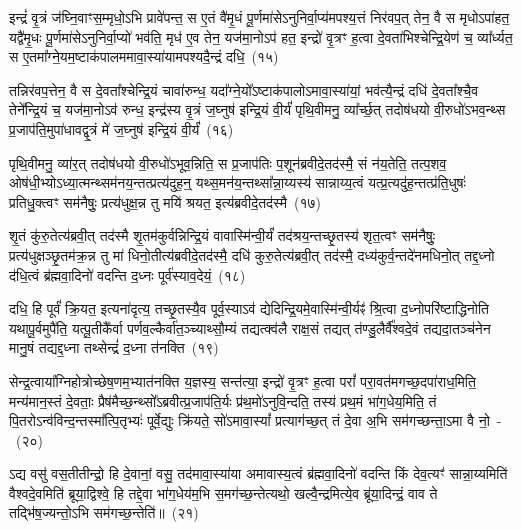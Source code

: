 {\anuvakamend[{अ॒स्य॒ मा वेदा द्यावा॑पृथि॒व्योर॑ब्रवी॒दिति॒ तस्मा᳚च्च॒त्वारि॑ च}]}

इन्द्रं॑ वृ॒त्रं ज॑घ्नि॒वाꣳस॒म्मृधो॒\-ऽभि प्रावे॑पन्त॒ स ए॒तं वै॑मृ॒धं पू॒र्णमा॑से\-ऽनुनिर्वा॒प्य॑मपश्य॒त्तं निर॑वप॒त् तेन॒ वै स मृधो\-ऽपा॑हत॒ यद्वै॑मृ॒धः पू॒र्णमा॑से\-ऽनुनिर्वा॒प्यो॑ भव॑ति॒ मृध॑ ए॒व तेन॒ यज॑मा॒नो\-ऽप॑ हत॒ इन्द्रो॑ वृ॒त्रꣳ ह॒त्वा दे॒वता॑भिश्चेन्द्रि॒येण॑ च॒ व्या᳚र्ध्यत॒ स ए॒तमा᳚ग्ने॒यम॒ष्टाक॑पालममावा॒स्या॑यामपश्यदै॒न्द्रं दधि॒~(१५)\ip

तन्निर॑वप॒त्तेन॒ वै स दे॒वता᳚श्चेन्द्रि॒यं चावा॑रुन्ध॒ यदा᳚ग्ने॒यो᳚\-ऽष्टाक॑पालो\-ऽमावा॒स्या॑यां॒ भव॑त्यै॒न्द्रं दधि॑ दे॒वता᳚श्चै॒व तेने᳚न्द्रि॒यं च॒ यज॑मा॒नो\-ऽव॑ रुन्ध॒ इन्द्र॑स्य वृ॒त्रं ज॒घ्नुष॑ इन्द्रि॒यं वी॒र्यं॑ पृथि॒वीमनु॒ व्या᳚र्च्छ॒त् तदोष॑धयो वी॒रुधो॑\-ऽभव॒न्थ्स प्र॒जा\-प॑ति॒मुपा॑धावद्वृ॒त्रं मे॑ ज॒घ्नुष॑ इन्द्रि॒यं वी॒र्यं॑~(१६)\ip

पृथि॒वीमनु॒ व्या॑र॒त् तदोष॑धयो वी॒रुधो॑\-ऽभूव॒न्निति॒ स प्र॒जा\-प॑तिः प॒शून॑ब्रवीदे॒तद॑स्मै॒ सं न॑य॒तेति॒ तत्प॒शव॒ ओष॑धी॒भ्यो\-ऽध्या॒त्मन्थ्सम॑नय॒न्तत्प्रत्य॑दुह॒न्॒ यथ्स॒मन॑य॒न्तथ्सा᳚न्ना॒य्यस्य॑ सान्नाय्य॒त्वं यत्प्र॒त्यदु॑ह॒न्तत्प्र॑ति॒धुषः॑ प्रतिधु॒क्त्वꣳ सम॑नैषुः॒ प्रत्य॑धुक्ष॒न्न तु मयि॑ श्रयत॒ इत्य॑ब्रवीदे॒तद॑स्मै~(१७)\ip

शृ॒तं कु॑रु॒तेत्य॑ब्रवी॒त् तद॑स्मै शृ॒तम॑कुर्वन्निन्द्रि॒यं वावास्मि॑न्वी॒र्यं॑ तद॑श्रय॒न्तच्छृ॒तस्य॑ शृत॒त्वꣳ सम॑नैषुः॒ प्रत्य॑धुक्षञ्छृ॒तम॑क्र॒न्न तु मा॑ धिनो॒तीत्य॑ब्रवीदे॒तद॑स्मै॒ दधि॑ कुरु॒तेत्य॑ब्रवी॒त् तद॑स्मै॒ दध्य॑कुर्व॒न्तदे॑नमधिनो॒त् तद्द॒ध्नो द॑धि॒त्वं ब्र॑ह्मवा॒दिनो॑ वदन्ति द॒ध्नः पूर्व॑स्याव॒देयं॒~(१८)\ip

दधि॒ हि पूर्वं॑ क्रि॒यत॒ इत्यना॑दृत्य॒ तच्छृ॒तस्यै॒व पूर्व॒स्या\-ऽव॑ द्येदिन्द्रि॒यमे॒वास्मि॑न्वी॒र्यꣴ॑ श्रि॒त्वा द॒ध्नोपरि॑ष्टाद्धिनोति यथापू॒र्वमुपै॑ति॒ यत्पू॒तीकै᳚र्वा पर्णव॒ल्कैर्वा॑त॒ञ्च्याथ्सौ॒म्यं तद्यत्क्व॑लै राक्ष॒सं तद्यत् त॑ण्डु॒लैर्वै᳚श्वदे॒वं तद्यदा॒तञ्च॑नेन मानु॒षं तद्यद्द॒ध्ना तथ्सेन्द्रं॑ द॒ध्ना त॑नक्ति~(१९)\ip

सेन्द्र॒त्वाया᳚ग्निहोत्रोच्छेष॒णम॒भ्यात॑नक्ति य॒ज्ञस्य॒ सन्त॑त्या॒ इन्द्रो॑ वृ॒त्रꣳ ह॒त्वा परां᳚ परा॒वत॑मगच्छ॒दपा॑राध॒मिति॒ मन्य॑मान॒स्तं दे॒वताः॒ प्रैष॑मैच्छ॒न्थ्सो᳚\-ऽब्रवीत्प्र॒जा\-प॑ति॒र्यः प्र॑थ॒मो॑\-ऽनुवि॒न्दति॒ तस्य॑ प्रथ॒मं भा॑ग॒धेय॒मिति॒ तं पि॒तरो\-ऽन्व॑विन्द॒न्तस्मा᳚त्पि॒तृभ्यः॑ पूर्वे॒द्युः क्रि॑यते॒ सो॑\-ऽमावा॒स्यां᳚ प्रत्याग॑च्छ॒त् तं दे॒वा अ॒भि सम॑गच्छन्ता॒\-ऽमा वै नो॒~-~(२०)\ip

ऽद्य वसु॑ वस॒तीतीन्द्रो॒ हि दे॒वानां॒ वसु॒ तद॑मावा॒स्या॑या अमावास्य॒त्वं ब्र॑ह्मवा॒दिनो॑ वदन्ति किं देव॒त्यꣳ॑ सान्ना॒य्यमिति॑ वैश्वदे॒वमिति॑ ब्रूया॒द्विश्वे॒ हि तद्दे॒वा भा॑ग॒धेय॑म॒भि स॒मग॑च्छ॒न्तेत्यथो॒ खल्वै॒न्द्रमित्ये॒व ब्रू॑या॒दिन्द्रं॒ वाव ते तद्भि॑ष॒ज्यन्तो॒\-ऽभि सम॑गच्छ॒न्तेति॑॥~(२१)\ip

